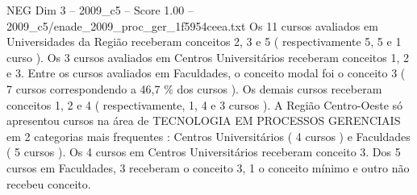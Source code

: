 \begin{textsample}{NEG Dim 3 – 2009\_c5 – Score 1.00 – 2009\_c5/enade\_2009\_proc\_ger\_1f5954ceea.txt}
Os 11 cursos avaliados em Universidades da Região receberam conceitos 2, 3 e 5 ( respectivamente 5, 5 e 1 curso ).
Os 3 cursos avaliados em Centros Universitários receberam conceitos 1, 2 e 3.
Entre os cursos avaliados em Faculdades, o conceito modal foi o conceito 3 ( 7 cursos correspondendo a 46,7 \% dos cursos ).
Os demais cursos receberam conceitos 1, 2 e 4 ( respectivamente, 1, 4 e 3 cursos ).
A Região Centro-Oeste só apresentou cursos na área de TECNOLOGIA EM PROCESSOS GERENCIAIS em 2 categorias mais frequentes : Centros Universitários ( 4 cursos ) e Faculdades ( 5 cursos ).
Os 4 cursos em Centros Universitários receberam conceito 3.
Dos 5 cursos em Faculdades, 3 receberam o conceito 3, 1 o conceito mínimo e outro não recebeu conceito.

\end{textsample}
